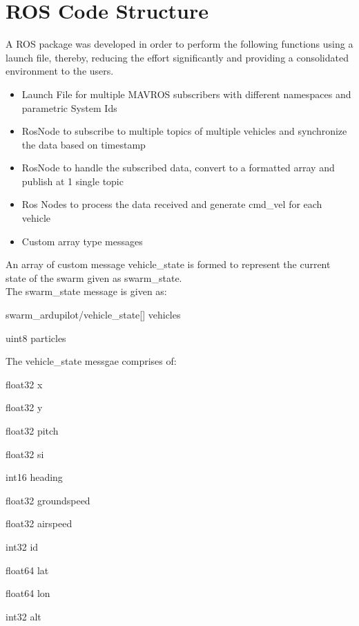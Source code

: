 \doublespacing
\section{ROS Code Structure}
A ROS package was developed in order to perform the following functions using a launch file, thereby, reducing the effort significantly and providing a consolidated environment to the users.
\begin{itemize}
    \item Launch File for multiple MAVROS subscribers with different namespaces and
parametric System Ids
    \item RosNode to subscribe to multiple topics of multiple vehicles and synchronize
the data based on timestamp
    \item RosNode to handle the subscribed data, convert to a formatted array and
publish at 1 single topic
    \item Ros Nodes to process the data received and generate cmd\_vel for each vehicle
    \item Custom array type messages
\end{itemize}

\noindent An array of custom message vehicle\_state is formed to represent the current state of the swarm given as swarm\_state.
\\The swarm\_state message is given as:

swarm\_ardupilot/vehicle\_state[] vehicles

uint8 particles

\noindent The vehicle\_state messgae comprises of: 

float32 x

float32 y

float32 pitch

float32 si

int16 heading

float32 groundspeed

float32 airspeed

int32 id

float64 lat

float64 lon

int32 alt

